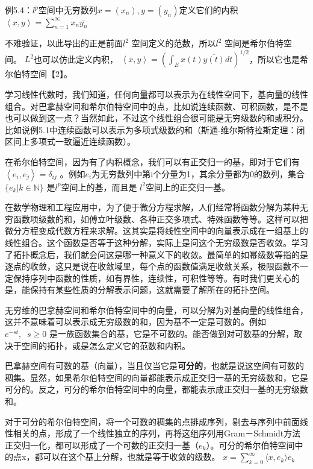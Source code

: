 \kaishu\setlength{\leftskip}{1em}

例5.4：$ l^p $空间中无穷数列$ x =(x_n), y = (y_n) $定义它们的内积 $ \left \langle x,y \right \rangle  = \sum_{n=1}^\infty x_n \overline{y_n} $

不难验证，以此导出的正是前面$ l^2 $ 空间定义的范数，所以$ l^2 $ 空间是希尔伯特空间。 $ L^2 $也可以仿此定义内积， $ \left \langle x,y \right \rangle  = (\int_E x(t) \overline{y(t)} dt)^{1/2} $，所以它也是希尔伯特空间【2】。

\songti\setlength{\leftskip}{0em}

学习线性代数时，我们知道，任何向量都可以表示为在线性空间下，基向量的线性组合。对巴拿赫空间和希尔伯特空间中的点，比如说连续函数、可积函数，是不是也可以做到这一点？当然如此，不过这个线性组合很可能是无穷级数的和或积分。比如说例5.1中连续函数可以表示为多项式级数的和（斯通-维尔斯特拉斯定理：闭区间上多项式一致逼近连续函数）。

在希尔伯特空间，因为有了内积概念，我们可以有正交归一的基，即对于它们有 $ \left \langle e_i,e_j \right \rangle $$= \delta_{ij} $
。例如$ e_i $为无穷数列中第i个分量为1，其余分量都为0的数列，集合$ \{e_k| k \in \mathbb{N}\} $ 是$ l^p $空间上的基，而且是 $ l^2 $空间上的正交归一基。

在数学物理和工程应用中，为了便于微分方程求解，人们经常将函数分解为某种无穷函数项级数的和，如傅立叶级数、各种正交多项式、特殊函数等等。这样可以把微分方程变成代数方程来求解。这其实是将线性空间中的向量表示成在一组基上的线性组合。这个函数是否等于这种分解，实际上是问这个无穷级数是否收敛。学习了拓扑概念后，我们就会问这是哪一种意义下的收敛。最简单的如幂级数等指的是逐点的收敛，这只是说在收敛域里，每个点的函数值满足收敛关系，极限函数不一定保持序列中函数的性质，如有界性，连续性，可积性等等。有时我们更关心的是，能保持有某些性质的分解表示问题，这就需要了解所在的拓扑空间。

无穷维的巴拿赫空间和希尔伯特空间中的向量，可以分解为对基向量的线性组合，这并不意味着可以表示成无穷级数的和，因为基不一定是可数的。例如 $ e^{-st},\;\;s\ge 0 $ 是一族函数集合的基，它是不可数的。能否做到对可数基的分解，取决于空间的拓扑，或是怎么定义它的范数和内积。

巴拿赫空间有可数的基（向量），当且仅当它是\textbf{可分的}，也就是说这空间有可数的稠集。显然，如果希尔伯特空间的向量都能表示成正交归一基的无穷级数和，它是可分的。反之，可分的希尔伯特空间中的向量，都能表示成正交归一基的无穷级数和。

对于可分的希尔伯特空间，将一个可数的稠集的点排成序列，剔去与序列中前面线性相关的点，形成了一个线性独立的序列，再将这组序列用Gram－Schmidt方法正交归一化，都可以形成了一个可数的正交归一基（$ e_k $）。可分的希尔伯特空间中的点x，都可以在这个基上分解，也就是等于收敛的级数。 $ x = \sum _{k=0}^\infty \langle x, e_k \rangle e_k $

